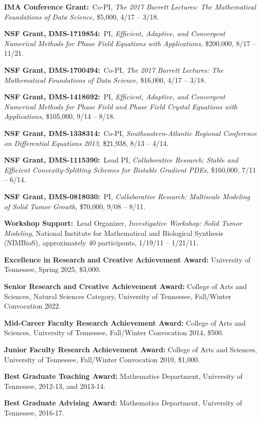 \documentclass[10pt,letterpaper]{article}
\begin{document}
\begin{description}
    \item
\textbf{IMA Conference Grant:}~Co-PI, {\sl The 2017 Barrett Lectures: The Mathematical Foundations of Data Science,} \$5,000, 4/17 -- 3/18.


    \item
\textbf{NSF Grant, DMS-1719854:}~PI, {\sl Efficient, Adaptive, and Convergent Numerical Methods for Phase Field Equations with Applications,} \$200,000, 8/17 -- 11/21.


	 \item
\textbf{NSF Grant, DMS-1700494:}~Co-PI, {\sl The 2017 Barrett Lectures: The Mathematical Foundations of Data Science,} \$16,000, 4/17 -- 3/18.

    \item
\textbf{NSF Grant, DMS-1418692:}~PI, {\sl Efficient, Adaptive, and Convergent Numerical Methods for Phase Field and Phase Field Crystal Equations with Applications,} \$105,000, 9/14 -- 8/18.

    \item
\textbf{NSF Grant, DMS-1338314:}~Co-PI, {\sl Southeastern-Atlantic Regional Conference on Differential Equations 2013,} \$21,938, 8/13 -- 4/14.

    \item
\textbf{NSF Grant, DMS-1115390:}~Lead PI, {\sl Collaborative Research: Stable and Efficient Convexity-Splitting Schemes for Bistable Gradient PDEs,} \$160,000, 7/11 -- 6/14.

    \item
\textbf{NSF Grant, DMS-0818030:}~PI, {\sl Collaborative Research: Multiscale Modeling of Solid Tumor Growth,} \$70,000, 9/08 -- 8/11.
	
	\item
\textbf{Workshop Support:}~Lead Organizer, {\sl Investigative Workshop: Solid Tumor Modeling}, National Institute for Mathematical and Biological Synthesis (NIMBioS), approximately 40 participants, 1/19/11 -- 1/21/11.

	\item
\textbf{Excellence in Research and
Creative Achievement Award:} University of Tennessee, Spring 2025, \$3,000.
	
	\item
\textbf{Senior Research and Creative Achievement Award:} College of Arts and Sciences, Natural Sciences Category, University of Tennessee, Fall/Winter Convocation 2022.
	
	\item
\textbf{Mid-Career Faculty Research Achievement Award:} College of Arts and Sciences, University of Tennessee, Fall/Winter Convocation 2014, \$500.
	\item
\textbf{Junior Faculty Research Achievement Award:} College of Arts and Sciences, University of Tennessee, Fall/Winter Convocation 2010, \$1,000.
	\item
\textbf{Best Graduate Teaching Award:} Mathematics Department, University of Tennessee, 2012-13, and 2013-14.
	\item
\textbf{Best Graduate Advising Award:} Mathematics Department, University of Tennessee, 2016-17.

    \end{description}
	
\end{document}
